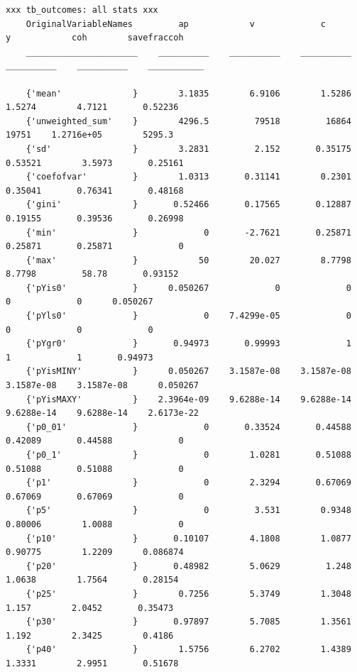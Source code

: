 \documentclass[
]{book}
\begin{document}
\begin{verbatim}
xxx tb_outcomes: all stats xxx
    OriginalVariableNames         ap            v             c             y            coh        savefraccoh
    ______________________    __________    __________    __________    __________    __________    ___________

    {'mean'              }        3.1835        6.9106        1.5286        1.5274        4.7121       0.52236 
    {'unweighted_sum'    }        4296.5         79518         16864         19751    1.2716e+05        5295.3 
    {'sd'                }        3.2831         2.152       0.35175       0.53521        3.5973       0.25161 
    {'coefofvar'         }        1.0313       0.31141        0.2301       0.35041       0.76341       0.48168 
    {'gini'              }       0.52466       0.17565       0.12887       0.19155       0.39536       0.26998 
    {'min'               }             0       -2.7621       0.25871       0.25871       0.25871             0 
    {'max'               }            50        20.027        8.7798        8.7798         58.78       0.93152 
    {'pYis0'             }      0.050267             0             0             0             0      0.050267 
    {'pYls0'             }             0    7.4299e-05             0             0             0             0 
    {'pYgr0'             }       0.94973       0.99993             1             1             1       0.94973 
    {'pYisMINY'          }      0.050267    3.1587e-08    3.1587e-08    3.1587e-08    3.1587e-08      0.050267 
    {'pYisMAXY'          }    2.3964e-09    9.6288e-14    9.6288e-14    9.6288e-14    9.6288e-14    2.6173e-22 
    {'p0_01'             }             0       0.33524       0.44588       0.42089       0.44588             0 
    {'p0_1'              }             0        1.0281       0.51088       0.51088       0.51088             0 
    {'p1'                }             0        2.3294       0.67069       0.67069       0.67069             0 
    {'p5'                }             0         3.531        0.9348       0.80006        1.0088             0 
    {'p10'               }       0.10107        4.1808        1.0877       0.90775        1.2209      0.086874 
    {'p20'               }       0.48982        5.0629         1.248        1.0638        1.7564       0.28154 
    {'p25'               }        0.7256        5.3749        1.3048         1.157        2.0452       0.35473 
    {'p30'               }       0.97897        5.7085        1.3561         1.192        2.3425        0.4186 
    {'p40'               }        1.5756        6.2702        1.4389        1.3331        2.9951       0.51678 

\end{verbatim}
\end{document}
